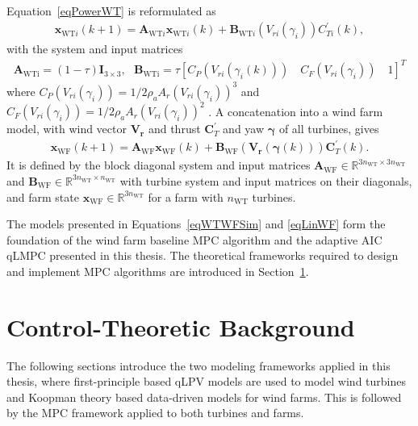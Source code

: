 Equation~\eqref{eqPowerWT} is reformulated as
\begin{align} \label{eqWTWFSim}
    \bm{x}_{\text{WT}i}(k+1) =\bm{A}_{\text{WT}i} \bm{x}_{\text{WT}i}(k) +\bm{B}_{\text{WT}i}(V_{ri}(\gamma_i))C_{Ti}^\prime(k), 
\end{align}
with the system and input matrices
\begin{align*}
    \bm{A}_{\text{WTi}} = (1-\tau)\bm{I}_{3\times3},\text{ }\bm{B}_{\text{WTi}} = \tau[ C_P(V_{ri}(\gamma_i(k))) \quad C_F(V_{ri}(\gamma_i)) \quad 1]^T
\end{align*}
where $C_P(V_{ri}(\gamma_i)) = 1/2 \rho_a A_r (V_{ri}(\gamma_{i}))^3$ and $C_F(V_{ri}(\gamma_i)) = 1/2 \rho_a A_r (V_{ri}(\gamma_{i}))^2$ .
A concatenation into a wind farm model, with wind vector $\bm{V_r}$ and thrust $\bm{C}_{T}^\prime$ and yaw $\bm{\gamma}$ of all turbines, gives 
\begin{align} \label{eqLinWF}
    \bm{x}_{\text{WF}}(k+1) = \bm{A}_{\text{WF}} \bm{x}_{\text{WF}}(k) + \bm{B}_{\text{WF}}(\bm{V_r}(\bm{\gamma}(k))) \bm{C}_{T}^\prime (k).
\end{align}
It is defined by the block diagonal system and input matrices $\bm{A}_{\text{WF}} \in {\mathbb{R}}^{3n_{\text{WT}} \times 3n_{\text{WT}}}$ and $\bm{B}_{\text{WF}} \in {\mathbb{R}}^{3n_{\text{WT}} \times n_{\text{WT}}}$ with turbine system and input matrices on their diagonals, and farm state $\bm{x}_{\text{WF}} \in {\mathbb{R}}^{3n_{\text{WT}}}$ for a farm with $n_{\text{WT}}$ turbines.

The models presented in Equations~\eqref{eqWTWFSim} and \eqref{eqLinWF} form the foundation of the wind farm baseline MPC algorithm and the adaptive AIC qLMPC presented in this thesis. The theoretical frameworks required to design and implement MPC algorithms are introduced in Section~\ref{sec:Control-Theoretic Background}.

\section{Control-Theoretic Background}\label{sec:Control-Theoretic Background}
The following sections introduce the two modeling frameworks applied in this thesis, where first-principle based qLPV models are used to model wind turbines and Koopman theory based data-driven models for wind farms. This is followed by the MPC framework applied to both turbines and farms.


